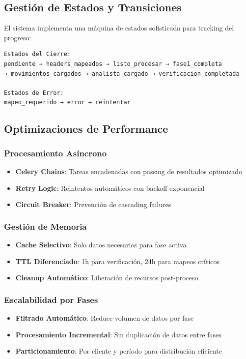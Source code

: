 \subsection{Gestión de Estados y Transiciones}

El sistema implementa una máquina de estados sofisticada para tracking del progreso:

\begin{verbatim}
Estados del Cierre:
pendiente → headers_mapeados → listo_procesar → fase1_completa 
→ movimientos_cargados → analista_cargado → verificacion_completada

Estados de Error:
mapeo_requerido → error → reintentar
\end{verbatim}

\subsection{Optimizaciones de Performance}

\subsubsection{Procesamiento Asíncrono}
\begin{itemize}
    \item \textbf{Celery Chains}: Tareas encadenadas con passing de resultados optimizado
    \item \textbf{Retry Logic}: Reintentos automáticos con backoff exponencial
    \item \textbf{Circuit Breaker}: Prevención de cascading failures
\end{itemize}

\subsubsection{Gestión de Memoria}
\begin{itemize}
    \item \textbf{Cache Selectivo}: Solo datos necesarios para fase activa
    \item \textbf{TTL Diferenciado}: 1h para verificación, 24h para mapeos críticos
    \item \textbf{Cleanup Automático}: Liberación de recursos post-proceso
\end{itemize}

\subsubsection{Escalabilidad por Fases}
\begin{itemize}
    \item \textbf{Filtrado Automático}: Reduce volumen de datos por fase
    \item \textbf{Procesamiento Incremental}: Sin duplicación de datos entre fases
    \item \textbf{Particionamiento}: Por cliente y período para distribución eficiente
\end{itemize}

